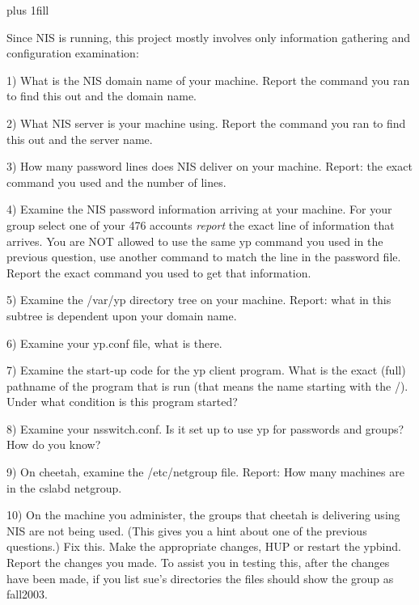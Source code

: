 
\rightskip=0pt plus 1fill

\parindent 0pt

Since NIS is running, this project mostly involves only
information gathering and configuration examination:

1) What is the NIS domain name of your machine.
Report the command you ran to find this out and the domain name.

2) What NIS server is your machine using.
Report the command you ran to find this out and the server name.

3) How many password lines does NIS deliver on your machine.
Report: the exact command you used and the number of lines.

4) Examine the NIS password information arriving at your machine.
For your group select one of your 476 accounts {\it report} the exact line of 
information that arrives.
You are NOT allowed to use the same yp command you used in the previous
question, use another command to match the line in the password file.
Report the exact command you used to get that information.

5) Examine the {\ltt{}/var/yp} directory tree on your machine.
Report: what in this subtree is dependent upon your domain name.

6) Examine your {\ltt{}yp.conf} file, what is there.

7) Examine the start-up code for the yp client program.
What is the exact (full) pathname of the program that is run
(that means the name starting with the {\ltt{}/}).
Under what condition is this program started?

8) Examine your {\ltt{}nsswitch.conf}.
Is it set up to use yp for passwords and groups?
How do you know?

9)  On cheetah, examine the {\ltt{}/etc/netgroup} file.
Report: How many machines are in the {\ltt{}cslabd} netgroup.

10) On the machine you administer, the groups that {\ltt{}cheetah} is
delivering using NIS are not being used. (This gives you
a hint about one of the previous questions.)
Fix this.
Make the appropriate changes, HUP or restart the {\ltt{}ypbind}.
Report the changes you made.
To assist you in testing this, after the changes have been made, if you
list sue's directories the files should show the group as {\ltt{}fall2003}.
\bye
